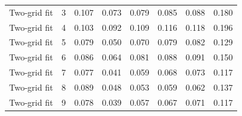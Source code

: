 \begin{tabular}{@{}lrcccccc@{}}
Two-grid fit & 3 & 0.107 & 0.073 & 0.079 & 0.085 & 0.088 & 0.180\\
Two-grid fit & 4 & 0.103 & 0.092 & 0.109 & 0.116 & 0.118 & 0.196\\
Two-grid fit & 5 & 0.079 & 0.050 & 0.070 & 0.079 & 0.082 & 0.129\\
Two-grid fit & 6 & 0.086 & 0.064 & 0.081 & 0.088 & 0.091 & 0.150\\
Two-grid fit & 7 & 0.077 & 0.041 & 0.059 & 0.068 & 0.073 & 0.117\\
Two-grid fit & 8 & 0.089 & 0.048 & 0.053 & 0.059 & 0.062 & 0.137\\
Two-grid fit & 9 & 0.078 & 0.039 & 0.057 & 0.067 & 0.071 & 0.117\\
\bottomrule
\end{tabular}
